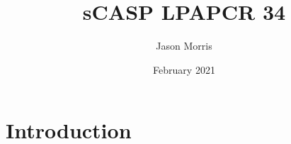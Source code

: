 \documentclass{article}
\title{sCASP LPAPCR 34}
\author{Jason Morris}
\date{February 2021}
\begin{document}
\maketitle

\section{Introduction}
\end{document}
